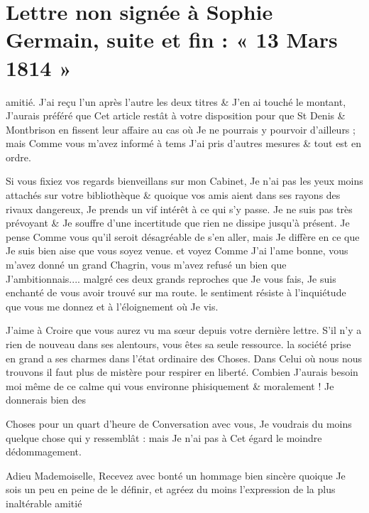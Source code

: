 \documentclass[11pt,a4paper]{article}
\begin{document}
\section{Lettre non signée à Sophie Germain, suite et fin : « 13 Mars 1814 »}

amitié. J'ai reçu l'un après l'autre les deux titres \& J'en ai touché le
montant, J'aurais préféré que Cet article restât à votre disposition pour que
St Denis \& Montbrison en fissent leur affaire au cas où Je ne pourrais y
pourvoir d'ailleurs ; mais Comme vous m'avez informé à tems J'ai pris
d'autres mesures \& tout est en ordre.


Si vous fixiez vos regards bienveillans sur mon Cabinet, Je n'ai pas les yeux
moins attachés sur votre bibliothèque \& quoique vos amis aient dans ses
rayons des rivaux dangereux, Je prends un vif intérêt à ce qui s'y passe. Je
ne suis pas très prévoyant \& Je souffre d'une incertitude que rien ne
dissipe jusqu'à présent. Je pense Comme vous qu'il seroit désagréable de s'en
aller, mais Je diffère en ce que Je suis bien aise que vous soyez venue. et
voyez Comme J'ai l'ame bonne, vous m'avez donné un grand Chagrin, vous m'avez
refusé un bien que J'ambitionnais.... malgré ces deux grands reproches que Je
vous fais, Je suis enchanté de vous avoir trouvé sur ma route. le sentiment
résiste à l'inquiétude que vous me donnez et à l'éloignement où Je vis.

J'aime à Croire que vous aurez vu ma sœur depuis votre dernière lettre. S'il
n'y a rien de nouveau dans ses alentours, vous êtes sa seule ressource. la
société prise en grand a ses charmes dans l'état ordinaire des Choses. Dans
Celui où nous nous trouvons il faut plus de mistère pour respirer en liberté.
Combien J'aurais besoin moi même de ce calme qui vous environne phisiquement
\& moralement ! Je donnerais bien des

Choses pour un quart d'heure de Conversation avec vous, Je voudrais du moins
quelque chose qui y ressemblât : mais Je n'ai pas à Cet égard le moindre
dédommagement.

Adieu Mademoiselle, Recevez avec bonté un hommage bien sincère quoique Je
sois un peu en peine de le définir, et agréez du moins l'expression de la
plus inaltérable amitié
\end{document}
